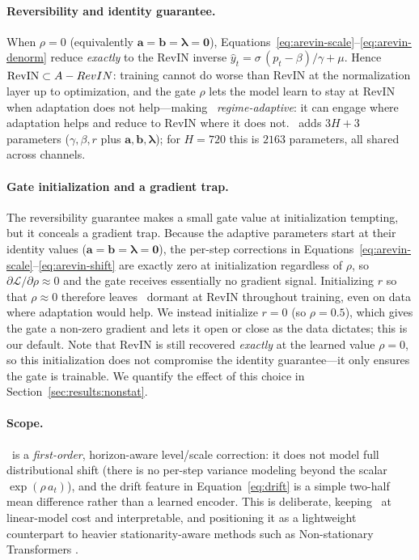 \paragraph{Reversibility and identity guarantee.}
When $\rho = 0$ (equivalently
$\mathbf{a}=\mathbf{b}=\boldsymbol{\lambda}=\mathbf{0}$),
Equations~\eqref{eq:arevin-scale}--\eqref{eq:arevin-denorm} reduce \emph{exactly}
to the RevIN inverse $\hat{y}_t = \sigma\,(p_t-\beta)/\gamma + \mu$. Hence
$\text{RevIN} \subset A-RevIN$: training cannot do worse than RevIN at the
normalization layer up to optimization, and the gate $\rho$ lets the model learn
to stay at RevIN when adaptation does not help---making \arevin\
\emph{regime-adaptive}: it can engage where adaptation helps and reduce to RevIN
where it does not. \arevin\ adds $3H+3$ parameters
($\gamma,\beta,r$ plus $\mathbf{a},\mathbf{b},\boldsymbol{\lambda}$); for
$H{=}720$ this is $2163$ parameters, all shared across channels.

\paragraph{Gate initialization and a gradient trap.}
The reversibility guarantee makes a small gate value at initialization tempting,
but it conceals a gradient trap. Because the adaptive parameters start at their
identity values ($\mathbf{a}=\mathbf{b}=\boldsymbol{\lambda}=\mathbf{0}$), the
per-step corrections in
Equations~\eqref{eq:arevin-scale}--\eqref{eq:arevin-shift} are exactly zero at
initialization regardless of $\rho$, so $\partial\mathcal{L}/\partial\rho \approx
0$ and the gate receives essentially no gradient signal. Initializing $r$ so that
$\rho \approx 0$ therefore leaves \arevin\ dormant at RevIN throughout training,
even on data where adaptation would help. We instead initialize $r{=}0$ (so
$\rho{=}0.5$), which gives the gate a non-zero gradient and lets it open or close
as the data dictates; this is our default. Note that RevIN is still recovered
\emph{exactly} at the learned value $\rho{=}0$, so this initialization does not
compromise the identity guarantee---it only ensures the gate is trainable. We
quantify the effect of this choice in Section~\ref{sec:results:nonstat}.

\paragraph{Scope.}
\arevin\ is a \emph{first-order}, horizon-aware level/scale correction: it does
not model full distributional shift (there is no per-step variance modeling
beyond the scalar $\exp(\rho\,a_t)$), and the drift feature in
Equation~\eqref{eq:drift} is a simple two-half mean difference rather than a
learned encoder. This is deliberate, keeping \arevin\ at linear-model cost and
interpretable, and positioning it as a lightweight counterpart to heavier
stationarity-aware methods such as Non-stationary Transformers
\citep{liu2022nonstationary}.

